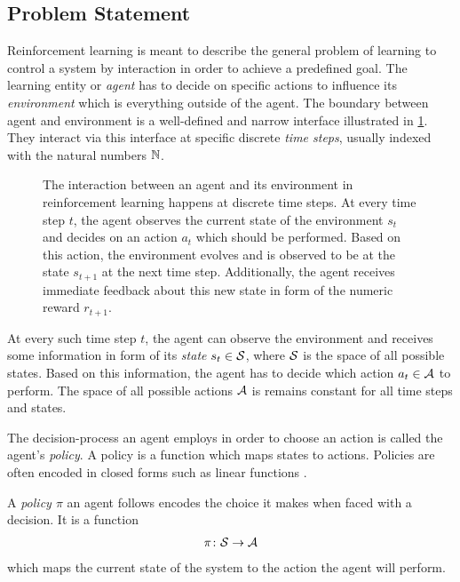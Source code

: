 \subsection{Problem Statement}
Reinforcement learning is meant to describe the general problem of learning to control a system by interaction in order to achieve a predefined goal.
The learning entity or \emph{agent} has to decide on specific actions to influence its \emph{environment} which is everything outside of the agent.
The boundary between agent and environment is a well-defined and narrow interface illustrated in \cref{fig:agent_environment_interaction}.
They interact via this interface at specific discrete \emph{time steps}, usually indexed with the natural numbers $\mathbb{N}$.
\begin{figure}[t]
    \centering
    
    \caption[Agent-environment interaction]{
        The interaction between an agent and its environment in reinforcement learning happens at discrete time steps.
        At every time step $t$, the agent observes the current state of the environment $s_t$ and decides on an action $a_t$ which should be performed.
        Based on this action, the environment evolves and is observed to be at the state $s_{t+1}$ at the next time step.
        Additionally, the agent receives immediate feedback about this new state in form of the numeric reward $r_{t+1}$.
    }
    \label{fig:agent_environment_interaction}
\end{figure}

At every such time step $t$, the agent can observe the environment and receives some information in form of its \emph{state} $s_t \in \mathcal{S}$, where $\mathcal{S}$ is the space of all possible states.
Based on this information, the agent has to decide which action $a_t \in \mathcal{A}$ to perform.
The space of all possible actions $\mathcal{A}$ is remains constant for all time steps and states.

The decision-process an agent employs in order to choose an action is called the agent's \emph{policy}.
A policy is a function which maps states to actions.
Policies are often encoded in closed forms such as linear functions \cite{deisenroth_efficient_2010}.
\begin{definition}[Policy]
    A \emph{policy $\pi$} an agent follows encodes the choice it makes when faced with a decision.
    It is a function
    \begin{align}
        \pi \colon \Es \to \Ah
    \end{align}
    which maps the current state of the system to the action the agent will perform.
\end{definition}

